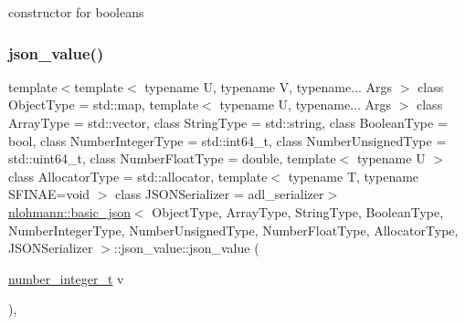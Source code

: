 constructor for booleans 

\mbox{\label{unionnlohmann_1_1basic__json_1_1json__value_a590de5a8704d5e3f0dba1cc47b8314a5}} 
\subsubsection{\texorpdfstring{json\_value()}{json\_value()}\hspace{0.1cm}{\footnotesize\ttfamily [3/12]}}
{\footnotesize\ttfamily template$<$template$<$ typename U, typename V, typename... Args $>$ class Object\+Type = std\+::map, template$<$ typename U, typename... Args $>$ class Array\+Type = std\+::vector, class String\+Type  = std\+::string, class Boolean\+Type  = bool, class Number\+Integer\+Type  = std\+::int64\+\_\+t, class Number\+Unsigned\+Type  = std\+::uint64\+\_\+t, class Number\+Float\+Type  = double, template$<$ typename U $>$ class Allocator\+Type = std\+::allocator, template$<$ typename T, typename S\+F\+I\+N\+A\+E=void $>$ class J\+S\+O\+N\+Serializer = adl\+\_\+serializer$>$ \\
\mbox{\hyperlink{classnlohmann_1_1basic__json}{nlohmann\+::basic\+\_\+json}}$<$ Object\+Type, Array\+Type, String\+Type, Boolean\+Type, Number\+Integer\+Type, Number\+Unsigned\+Type, Number\+Float\+Type, Allocator\+Type, J\+S\+O\+N\+Serializer $>$\+::json\+\_\+value\+::json\+\_\+value (\begin{DoxyParamCaption}\item[{\mbox{\hyperlink{classnlohmann_1_1basic__json_a98e611d67b7bd75307de99c9358ab2dc}{number\+\_\+integer\+\_\+t}}}]{v }\end{DoxyParamCaption})\hspace{0.3cm}{\ttfamily [inline]}, {\ttfamily [noexcept]}}




